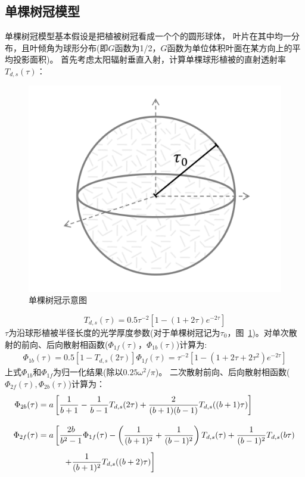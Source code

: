 \subsection{单棵树冠模型}
单棵树冠模型基本假设是把植被树冠看成一个个的圆形球体，
叶片在其中均一分布，且叶倾角为球形分布(即$G$函数为1/2，$G$函数为单位体积叶面在某方向上的平均投影面积)。
首先考虑太阳辐射垂直入射，计算单棵球形植被的直射透射率$T_{d,s}\left(\tau\right)$：
{
\begin{figure}[htbp]
\centering
\includegraphics[width=0.6\columnwidth]{Figures/辐射过程及辐射通量计算/单棵树冠示意图.png}
\caption{单棵树冠示意图}
\label{fig:单棵树冠示意图}
\end{figure}
}
%
\begin{equation}\label{T_ds_tau}
T_{d, s}(\tau)=0.5 \tau^{-2}\left[1-(1+2 \tau) e^{-2 \tau}\right]
\end{equation}
$\tau$为沿球形植被半径长度的光学厚度参数(对于单棵树冠记为$\tau_0$，图~\ref{fig:单棵树冠示意图})。对单次散射的前向、后向散射相函数($\Phi_{1f}\left(\tau\right)$，$\Phi_{1b}\left(\tau\right)$)计算为:
\begin{align}
\Phi_{1 b}(\tau)=0.5\left[1-T_{d, s}(2 \tau)\right]
\Phi_{1 f}(\tau)=\tau^{-2}\left[1-\left(1+2 \tau+2 \tau^{2}\right) e^{-2 \tau}\right]
\end{align}
上式$\Phi_{1b}$和$\Phi_{1f}$为归一化结果(除以$0.25\omega^2/\pi$)。
二次散射前向、后向散射相函数($\Phi_{2f}\left(\tau\right), \Phi_{2b}\left(\tau\right)$)计算为：
\begin{align}
\Phi_{2 b}(\tau) & =a\left[\frac{1}{b+1}-\frac{1}{b-1} T_{d, s}(2 \tau)+\frac{2}{(b+1)(b-1)} T_{d, s}((b+1) \tau)\right] \\[2ex]
%
\Phi_{2 f}(\tau) & =a\left[\frac{2 b}{b^{2}-1} \Phi_{1 f}(\tau)-\left(\frac{1}{(b+1)^{2}}+\frac{1}{(b-1)^{2}}\right) T_{d, s}(\tau)+\frac{1}{(b-1)^{2}} T_{d, s}(b \tau)\right. \notag \\[1ex] 
&\qquad \left.\quad+\frac{1}{(b+1)^{2}} T_{d, s}((b+2) \tau)\right]
\end{align}
